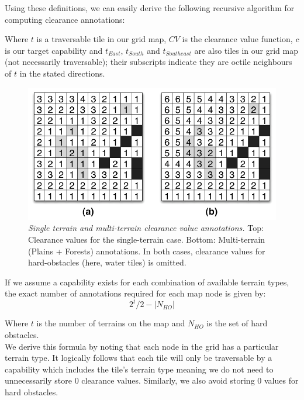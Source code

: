 Using these definitions, we can easily derive the following recursive algorithm for computing clearance annotations:



Where $t$ is a traversable tile in our grid map, $CV$ is the clearance value function, $c$ is our target capability and $t_{East}$, $t_{South}$ and $t_{Southeast}$ are also tiles in our grid map (not necessarily traversable); their  subscripts indicate they are octile neighbours of $t$ in the stated directions.

\begin{figure}[htbp]
        \caption{\emph{Single terrain and multi-terrain clearance value annotations.} Top: Clearance values for the single-terrain case. Bottom: Multi-terrain (Plains + Forests) annotations. In both cases, clearance values for hard-obstacles (here, water tiles) is omitted.}
        \begin{center}
                        \includegraphics[scale=0.25]{diagrams/annotations.png}
        \end{center}
        \label{aha-fig:annotations}
\end{figure}

If we assume a capability exists for each combination of available terrain types, the exact number of annotations required for each map node is given by:
\begin{equation}
2^t/2 - |N_{HO}|
\label{aha-eq:gridannotations}
\end{equation}

Where $t$ is the number of terrains on the map and $N_{HO}$ is the set of hard obstacles. \\ \newline
We derive this formula by noting that each node in the grid has a particular terrain type. It logically follows that each tile will only be traversable by a capability which includes the tile's terrain type meaning we do not need to unnecessarily store 0 clearance values. Similarly, we also avoid storing 0 values for hard obstacles.

